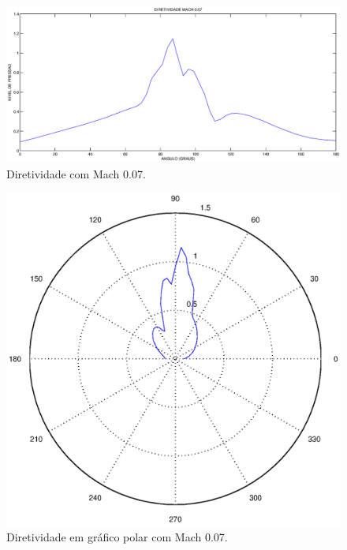 \begin{figure}[h!]
    \centering
    \hspace{-1.cm}
    \includegraphics[width=1\textwidth]{Mach_0.07/diretividade.eps}
    \caption{Diretividade com Mach 0.07.}
\end{figure}

\begin{figure}[h!]
    \centering
    \hspace{-1.cm}
    \includegraphics[width=1\textwidth]{Mach_0.07/diretividade_polar.eps}
    \caption{Diretividade em gráfico polar com Mach 0.07.}
\end{figure}

\newpage

